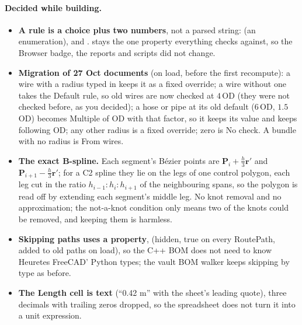 \paragraph{Decided while building.}
\begin{itemize}[nosep]
  \item \textbf{A rule is a choice plus two numbers}, not a parsed string:  (an enumeration),
         and .  stays the one property everything checks
        against, so the Browser badge, the reports and scripts did not change.
  \item \textbf{Migration of 27 Oct documents} (on load, before the first recompute): a wire with a radius typed in
        keeps it as a fixed override; a wire without one takes the Default rule, so old wires are now checked at
        $4\,$OD (they were not checked before, as you decided); a hose or pipe at its old default ($6\,$OD, $1.5\,$OD)
        becomes Multiple of OD with that factor, so it keeps its value and keeps following OD; any other radius is a
        fixed override; zero is No check. A bundle with no radius is From wires.
  \item \textbf{The exact B-spline.} Each segment's Bézier points are $\mathbf P_i + \tfrac h3\mathbf r'$ and
        $\mathbf P_{i+1} - \tfrac h3\mathbf r'$; for a C2 spline they lie on the legs of one control polygon, each
        leg cut in the ratio $h_{i-1}:h_i:h_{i+1}$ of the neighbouring spans, so the polygon is read off by extending
        each segment's middle leg. No knot removal and no approximation; the not-a-knot condition only means two of
        the knots could be removed, and keeping them is harmless.
  \item \textbf{Skipping paths uses a property},  (hidden, true on every RoutePath, added to old
        paths on load), so the C++ BOM does not need to know Heuretes FreeCAD' Python types; the vault BOM walker keeps
        skipping by type as before.
  \item \textbf{The Length cell is text} (``0.42 m'' with the sheet's leading quote), three decimals with trailing
        zeros dropped, so the spreadsheet does not turn it into a unit expression.
\end{itemize}

